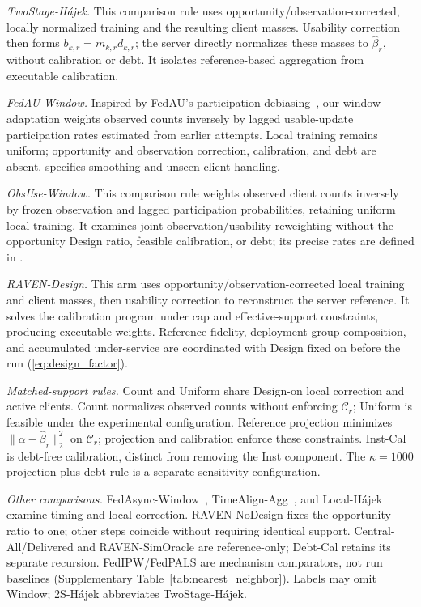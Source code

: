 \documentclass[letterpaper,journal]{IEEEtran}
\begin{document}
\noindent\textit{TwoStage-H\'ajek.}
This comparison rule uses opportunity/observation-corrected, locally normalized
training and the resulting client masses. Usability correction then forms
$b_{k,r}=m_{k,r}d_{k,r}$; the server directly normalizes these masses to
$\widehat\beta_r$, without calibration or debt. It isolates reference-based aggregation
from executable calibration.

\noindent\textit{FedAU-Window.}
Inspired by FedAU's participation debiasing~\cite{wang2024lightweight}, our
window adaptation weights observed counts inversely by lagged usable-update
participation rates estimated from earlier attempts. Local training remains
uniform; opportunity and observation correction, calibration, and debt are absent.
 specifies smoothing and unseen-client handling.

\noindent\textit{ObsUse-Window.}
This comparison rule weights observed client counts inversely by frozen
observation and lagged participation probabilities, retaining uniform local
training. It examines joint observation/usability reweighting without the
opportunity Design ratio, feasible calibration, or debt; its precise rates
are defined in .

\noindent\textit{RAVEN-Design.}
This arm uses opportunity/observation-corrected local training and
client masses, then usability correction to reconstruct the server reference.
It solves the calibration program under cap and effective-support constraints, producing executable weights. Reference fidelity, deployment-group composition, and accumulated under-service
are coordinated with Design fixed on before the run (\eqref{eq:design_factor}).

\noindent\textit{Matched-support rules.}
Count and Uniform share Design-on local correction and active clients.
Count normalizes observed counts without enforcing $\mathcal C_r$;
Uniform is feasible under the experimental configuration.
Reference projection minimizes $\|\alpha-\widehat\beta_r\|_2^2$ on
$\mathcal C_r$; projection and calibration enforce these constraints.
Inst-Cal is debt-free calibration, distinct from removing the Inst component.
The $\kappa=1000$ projection-plus-debt rule is a separate sensitivity configuration.

\noindent\textit{Other comparisons.}
FedAsync-Window~\cite{xie2019asynchronous}, TimeAlign-Agg~\cite{wang2026federated},
and Local-H\'ajek examine timing and local correction. RAVEN-NoDesign fixes
the opportunity ratio to one; other steps coincide without requiring identical support.
Central-All/Delivered and RAVEN-SimOracle are reference-only; Debt-Cal retains
its separate recursion. FedIPW/FedPALS are mechanism comparators, not run
baselines (Supplementary Table~\ref{tab:nearest_neighbor}). Labels may omit
Window; 2S-H\'ajek abbreviates TwoStage-H\'ajek.
\end{document}
